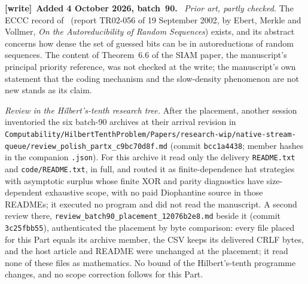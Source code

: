 \documentclass[11pt,letterpaper]{article}
\theoremstyle{definition}
\newenvironment{writenote}[1][]{\par\smallskip\begingroup\small
 \noindent\textbf{[write]}\if\relax\detokenize{#1}\relax\else~\textbf{#1.}\fi\ }%
 {\par\endgroup\smallskip}
\begin{document}
\begin{writenote}[Added 4 October 2026, batch~90]
\emph{Prior art, partly checked.} The ECCC record of~\cite{hat:EMV} (report TR02-056 of 19 September 2002, by Ebert, Merkle and Vollmer, \emph{On the Autoreducibility of Random Sequences}) exists, and its abstract concerns how dense the set of guessed bits can be in autoreductions of random sequences. The content of Theorem~6.6 of the SIAM paper, the manuscript's principal priority reference, was not checked at the write; the manuscript's own statement that the coding mechanism and the slow-density phenomenon are not new stands as its claim.

\emph{Review in the Hilbert's-tenth research tree.} After the placement, another session inventoried the six batch-90 archives at their arrival revision in \nolinkurl{Computability/HilbertTenthProblem/Papers/research-wip/native-stream-queue/review_polish_partx_c9bc70d8f.md} (commit \texttt{bcc1a4438}; member hashes in the companion \texttt{.json}). For this archive it read only the delivery \texttt{README.txt} and \texttt{code/README.txt}, in full, and routed it as finite-dependence hat strategies with asymptotic surplus whose finite XOR and parity diagnostics have size-dependent exhaustive scope, with no paid Diophantine source in those READMEs; it executed no program and did not read the manuscript. A second review there, \nolinkurl{review_batch90_placement_12076b2e8.md} beside it (commit \texttt{3c25fbb55}), authenticated the placement by byte comparison: every file placed for this Part equals its archive member, the CSV keeps its delivered CRLF bytes, and the host article and README were unchanged at the placement; it read none of these files as mathematics. No bound of the Hilbert's-tenth programme changes, and no scope correction follows for this Part.


\end{writenote}
\end{document}
